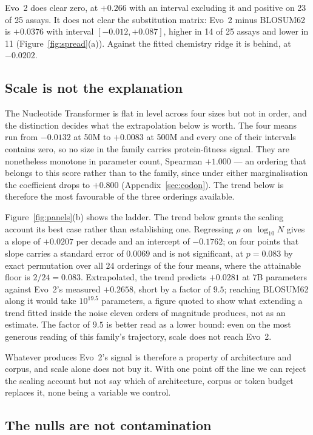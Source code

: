 \documentclass[11pt]{article}
\begin{document}
Evo~2 does clear zero, at $+0.266$ with an interval excluding it and positive on 23
of 25 assays. It does not clear the substitution matrix: Evo~2 minus BLOSUM62 is
$+0.0376$ with interval $[-0.012,+0.087]$, higher in 14 of 25 assays and lower in
11 (Figure~\ref{fig:spread}(a)). Against the fitted
chemistry ridge it is behind, at $-0.0202$.

\subsection{Scale is not the explanation}
\label{sec:scale}

The Nucleotide Transformer is flat in level across four sizes but not in order,
and the distinction decides what the extrapolation below is worth. The four means
run from $-0.0132$ at 50M to $+0.0083$ at 500M and every one of their intervals
contains zero, so no size in the family carries protein-fitness signal. They are
nonetheless monotone in parameter count, Spearman $+1.000$ --- an ordering that
belongs to this score rather than to the family, since under either
marginalisation the coefficient drops to $+0.800$ (Appendix~\ref{sec:codon}). The
trend below is therefore the most favourable of the three orderings available.

Figure~\ref{fig:panels}(b) shows the ladder. The trend below grants the scaling
account its best case rather than establishing one. Regressing $\rho$ on $\log_{10} N$ gives a slope of $+0.0207$ per
decade and an intercept of $-0.1762$; on four points that slope carries a standard
error of $0.0069$ and is not significant, at $p=0.083$ by exact permutation over
all $24$ orderings of the four means, where the attainable floor is $2/24=0.083$. Extrapolated, the trend
predicts $+0.0281$ at 7B parameters against Evo~2's measured $+0.2658$, short by a
factor of $9.5$; reaching BLOSUM62 along it would take $10^{19.5}$ parameters, a
figure quoted to show what extending a trend fitted inside the noise eleven orders
of magnitude produces, not as an estimate. The factor of $9.5$ is better read as a
lower bound: even on the most generous reading of this family's trajectory, scale
does not reach Evo~2.

Whatever produces Evo~2's signal is therefore a property of architecture and
corpus, and scale alone does not buy it. With one point off the line we can reject
the scaling account but not say which of architecture, corpus or token budget
replaces it, none being a variable we control.

\subsection{The nulls are not contamination}
\label{sec:membership}
\end{document}
